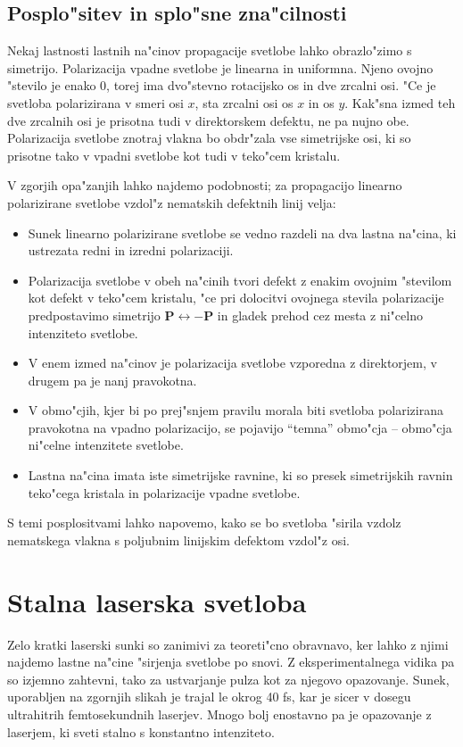 \documentclass[12pt,twoside,openright,final]{report}
\renewcommand{\vec}{\mathbf}
\begin{document}
\section{Posplo"sitev in splo"sne zna"cilnosti}
Nekaj lastnosti lastnih na"cinov propagacije svetlobe lahko obrazlo"zimo s simetrijo. 
Polarizacija vpadne svetlobe je linearna in uniformna. 
Njeno ovojno "stevilo je enako 0, torej ima dvo"stevno rotacijsko os in dve zrcalni osi. 
"Ce je svetloba polarizirana v smeri osi $x$, sta zrcalni osi os $x$ in os $y$. 
Kak"sna izmed teh dve zrcalnih osi je prisotna tudi v direktorskem defektu, ne pa nujno obe. 
Polarizacija svetlobe znotraj vlakna bo obdr"zala vse simetrijske osi, ki so prisotne tako v vpadni svetlobe kot tudi v teko"cem kristalu. 

V zgorjih opa"zanjih lahko najdemo podobnosti; za propagacijo linearno polarizirane svetlobe vzdol"z nematskih defektnih linij velja:
\begin{itemize}
 \item Sunek linearno polarizirane svetlobe se vedno razdeli na dva lastna na"cina, ki ustrezata redni in izredni polarizaciji.
 \item Polarizacija svetlobe v obeh na"cinih tvori defekt z enakim ovojnim "stevilom kot defekt v teko"cem kristalu, "ce pri dolocitvi ovojnega stevila polarizacije predpostavimo simetrijo $\vec P \leftrightarrow -\vec P$ in gladek prehod cez mesta z ni"celno intenziteto svetlobe. 
 \item V enem izmed na"cinov je polarizacija svetlobe vzporedna z direktorjem, v drugem pa je nanj pravokotna.
 \item V obmo"cjih, kjer bi po prej"snjem pravilu morala biti svetloba polarizirana pravokotna na vpadno polarizacijo, se pojavijo ``temna'' obmo"cja -- obmo"cja ni"celne intenzitete svetlobe.
 \item Lastna na"cina imata iste simetrijske ravnine, ki so presek simetrijskih ravnin teko"cega kristala in polarizacije vpadne svetlobe. 
\end{itemize}

S temi posplositvami lahko napovemo, kako se bo svetloba "sirila vzdolz nematskega vlakna s poljubnim linijskim defektom vzdol"z osi. 

\chapter{Stalna laserska svetloba}

Zelo kratki laserski sunki so zanimivi za teoreti"cno obravnavo, ker lahko z njimi najdemo lastne na"cine "sirjenja svetlobe po snovi. 
Z eksperimentalnega vidika pa so izjemno zahtevni, tako za ustvarjanje pulza kot za njegovo opazovanje. 
Sunek, uporabljen na zgornjih slikah je trajal le okrog 40 fs, kar je sicer v dosegu ultrahitrih femtosekundnih laserjev. 
Mnogo bolj enostavno pa je opazovanje z laserjem, ki sveti stalno s konstantno intenziteto. 
\end{document}
